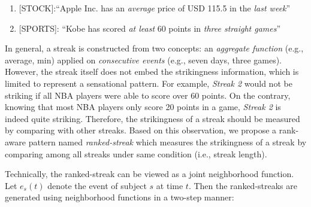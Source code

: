 
\begin{enumerate}
	\item{[STOCK]:``Apple Inc. has an \emph{average} price of USD 115.5 in the \emph{last week}''}
	\item{[SPORTS]: ``Kobe has scored \emph{at least} 60 points in \emph{three straight games}'' }
\end{enumerate}
In general, a streak is constructed from two concepts: an \emph{aggregate function} (e.g., average, min)
applied on \emph{consecutive events} (e.g., seven days, three games). 
However, the streak itself does not embed the strikingness information, which is limited
to represent a sensational pattern. 
%
%
%
For example, \emph{Streak 2} would not be striking if all NBA players were able to score over 60 points. 
On the contrary, knowing that most NBA players only score 20 points in a game,
\emph{Streak 2} is indeed quite striking. 
Therefore, the strikingness of a streak should be measured by comparing with other streaks.
Based on this observation, we propose a rank-aware pattern named \emph{ranked-streak} which measures the strikingness of
a streak by comparing among all streaks under same condition (i.e., streak length).

Technically, the ranked-streak can be viewed as a joint neighborhood function. 
Let $e_s(t)$ denote the event of subject $s$ at time $t$. Then the ranked-streaks are generated using neighborhood functions in a two-step manner: 


